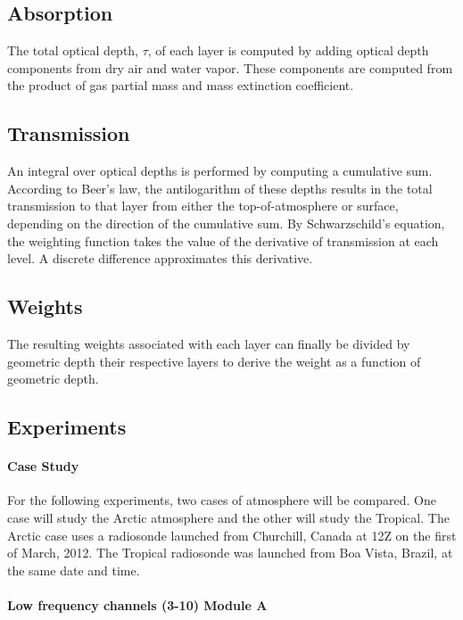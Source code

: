 \documentclass[twocol]{ametsoc}
\begin{document}
\subsection{Absorption}

The total optical depth, $\tau$, of each layer is computed by adding optical depth components from dry air and water vapor.
These components are computed from the product of gas partial mass and mass extinction coefficient.

\subsection{Transmission}

An integral over optical depths is performed by computing a cumulative sum.
According to Beer's law, the antilogarithm of these depths results in the total transmission to that layer from either the top-of-atmosphere or surface, depending on the direction of the cumulative sum.
By Schwarzschild's equation, the weighting function takes the value of the derivative of transmission at each level.
A discrete difference approximates this derivative.

\subsection{Weights}

The resulting weights associated with each layer can finally be divided by geometric depth their respective layers to derive the weight as a function of geometric depth.

\subsection{Experiments}

\paragraph*{Case Study} For the following experiments, two cases of atmosphere will be compared.
One case will study the Arctic atmosphere and the other will study the Tropical.
The Arctic case uses a radiosonde launched from Churchill, Canada at 12Z on the first of March, 2012.
The Tropical radiosonde was launched from Boa Vista, Brazil, at the same date and time.

\paragraph{Low frequency channels (3-10) Module A }
 
\end{document}
